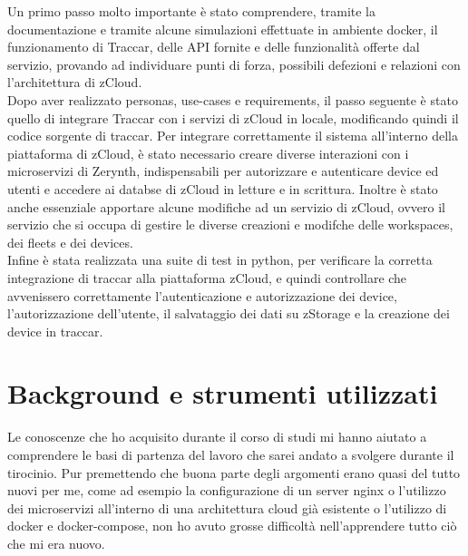 \documentclass[a4paper,titlepage,12pt]{book}
\begin{document}
{Un primo passo molto importante è stato comprendere, tramite la documentazione e tramite alcune simulazioni effettuate in ambiente docker, il funzionamento di Traccar, delle API fornite e delle funzionalità offerte dal servizio, provando ad individuare punti di forza, possibili defezioni e relazioni con l'architettura di zCloud.  \\
Dopo aver realizzato personas, use-cases e requirements, il passo seguente è stato quello di integrare Traccar con i servizi di zCloud in locale, modificando quindi il codice sorgente di traccar. Per integrare correttamente il sistema all'interno della piattaforma di zCloud, è stato necessario creare diverse interazioni con i microservizi di Zerynth, indispensabili per autorizzare e autenticare device ed utenti e accedere ai databse di zCloud in letture e in scrittura. Inoltre è stato anche essenziale apportare alcune modifiche ad un servizio di zCloud, ovvero il servizio che si occupa di gestire le diverse creazioni e modifche delle workspaces, dei fleets e dei devices. \\
Infine è stata realizzata una suite di test in python, per verificare la corretta integrazione di traccar alla piattaforma zCloud, e quindi controllare che avvenissero correttamente l'autenticazione e autorizzazione dei device, l'autorizzazione dell'utente, il salvataggio dei dati su zStorage e la creazione dei device in traccar.
\chapter{
Background e strumenti utilizzati}
Le conoscenze che ho acquisito durante il corso di studi mi hanno aiutato a comprendere le basi di partenza del lavoro che sarei andato a svolgere durante il tirocinio. Pur premettendo che buona parte degli argomenti erano quasi del tutto nuovi per me, come ad esempio la configurazione di un server nginx o l'utilizzo dei microservizi all'interno di una architettura cloud già esistente o l'utilizzo di docker e docker-compose, non ho avuto grosse difficoltà nell'apprendere tutto ciò che mi era nuovo.


{
}}
\end{document}

